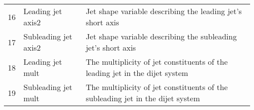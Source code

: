 {\begin{tabular}{cll}
16            & Leading jet axis2                            & Jet shape variable describing the leading jet's short axis\\
17            & Subleading jet axis2                         & Jet shape variable describing the subleading jet's short axis\\
18            & Leading jet mult                             & The multiplicity of jet constituents of the leading jet in the dijet system\\
19            & Subleading jet mult                          & The multiplicity of jet constituents of the subleading jet in the dijet system\\
\hline
\end{tabular}}

